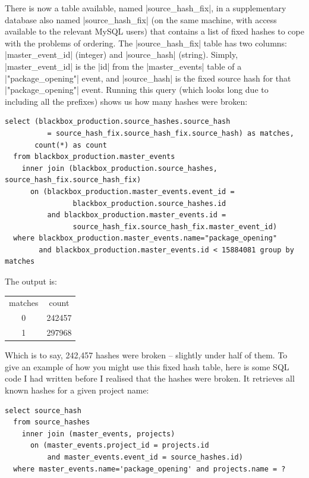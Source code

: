 \documentclass{report}
\begin{document}
There is now a table available, named |source_hash_fix|, in a supplementary database also named |source_hash_fix| (on the same machine, with access available to the relevant MySQL users) that contains a list of fixed hashes to cope with the problems of ordering.  The |source_hash_fix| table has two columns: |master_event_id| (integer) and |source_hash| (string).  Simply, |master_event_id| is the |id| from the |master_events| table of a |"package_opening"| event, and |source_hash| is the fixed source hash for that |"package_opening"| event.  Running this query (which looks long due to including all the prefixes) shows us how many hashes were broken:

\begin{lstlisting}
select (blackbox_production.source_hashes.source_hash
          = source_hash_fix.source_hash_fix.source_hash) as matches,
       count(*) as count
  from blackbox_production.master_events
    inner join (blackbox_production.source_hashes, source_hash_fix.source_hash_fix)
      on (blackbox_production.master_events.event_id =
                blackbox_production.source_hashes.id
          and blackbox_production.master_events.id =
                source_hash_fix.source_hash_fix.master_event_id)
  where blackbox_production.master_events.name="package_opening"
        and blackbox_production.master_events.id < 15884081 group by matches
\end{lstlisting}

The output is:

\begin{tabular}{cc}
matches & count \\
0 & 242457 \\
1 & 297968 \\
\end{tabular}

Which is to say, 242,457 hashes were broken -- slightly under half of them.  To give an example of how you might use this fixed hash table, here is some SQL code I had written before I realised that the hashes were broken.  It retrieves all known hashes for a given project name:

\begin{lstlisting}
select source_hash
  from source_hashes
    inner join (master_events, projects)
      on (master_events.project_id = projects.id
          and master_events.event_id = source_hashes.id)
  where master_events.name='package_opening' and projects.name = ?
\end{lstlisting}
\end{document}
